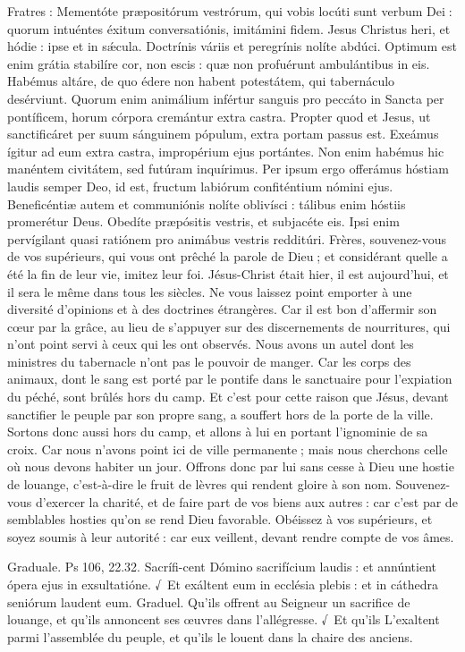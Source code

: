 \begin{paracol}{2}
Fratres : Mementóte præpositórum vestrórum, qui vobis locúti sunt verbum Dei : quorum intuéntes éxitum conversatiónis, imitámini fidem. Jesus Christus heri, et hódie : ipse et in sǽcula. Doctrínis váriis et peregrínis nolíte abdúci. Optimum est enim grátia stabilíre cor, non escis : quæ non profuérunt ambulántibus in eis. Habémus altáre, de quo édere non habent potestátem, qui tabernáculo desérviunt. Quorum enim animálium infértur sanguis pro peccáto in Sancta per pontíficem, horum córpora cremántur extra castra. Propter quod et Jesus, ut sanctificáret per suum sánguinem pópulum, extra portam passus est. Exeámus ígitur ad eum extra castra, impropérium ejus portántes. Non enim habémus hic manéntem civitátem, sed futúram inquírimus. Per ipsum ergo offerámus hóstiam laudis semper Deo, id est, fructum labiórum confiténtium nómini ejus. Beneficéntiæ autem et communiónis nolíte oblivísci : tálibus enim hóstiis promerétur Deus. Obedíte præpósitis vestris, et subjacéte eis. Ipsi enim pervígilant quasi ratiónem pro animábus vestris redditúri.
\switchcolumn
Frères, souvenez-vous de vos supérieurs, qui vous ont prêché la parole de Dieu ; et considérant quelle a été la fin de leur vie, imitez leur foi. Jésus-Christ était hier, il est aujourd’hui, et il sera le même dans tous les siècles. Ne vous laissez point emporter à une diversité d’opinions et à des doctrines étrangères. Car il est bon d’affermir son cœur par la grâce, au lieu de s’appuyer sur des discernements de nourritures, qui n’ont point servi à ceux qui les ont observés. Nous avons un autel dont les ministres du tabernacle n’ont pas le pouvoir de manger. Car les corps des animaux, dont le sang est porté par le pontife dans le sanctuaire pour l’expiation du péché, sont brûlés hors du camp. Et c’est pour cette raison que Jésus, devant sanctifier le peuple par son propre sang, a souffert hors de la porte de la ville. Sortons donc aussi hors du camp, et allons à lui en portant l’ignominie de sa croix. Car nous n’avons point ici de ville permanente ; mais nous cherchons celle où nous devons habiter un jour. Offrons donc par lui sans cesse à Dieu une hostie de louange, c’est-à-dire le fruit de lèvres qui rendent gloire à son nom. Souvenez-vous d’exercer la charité, et de faire part de vos biens aux autres : car c’est par de semblables hosties qu’on se rend Dieu favorable. Obéissez à vos supérieurs, et soyez soumis à leur autorité : car eux veillent, devant rendre compte de vos âmes.
\switchcolumn*

Graduale. Ps 106, 22.32. Sacrífi-cent Dómino sacrifícium laudis : et annúntient ópera ejus in exsultatióne. √~Et exáltent eum in ecclésia plebis : et in cáthedra seniórum laudent eum.
\switchcolumn
Graduel. Qu’ils offrent au Seigneur un sacrifice de louange, et qu’ils annoncent ses œuvres dans l’allégresse. √~Et qu’ils L’exaltent parmi l’assemblée du peuple, et qu’ils le louent dans la chaire des anciens.
\switchcolumn*


\end{paracol}
